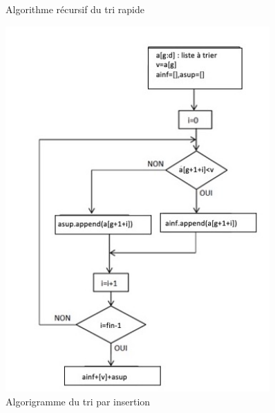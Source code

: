 \begin{figure}[!htb]
\begin{minipage}{0.5\textwidth}
\begin{algorithme}

\begin{center}
		
\end{center}


\end{algorithme}

\begin{algorithme}{Algorithme récursif du tri rapide}
\begin{center}
		
\end{center}
\end{algorithme}


\end{minipage}
\begin{minipage}{0.5\textwidth}
\begin{center}
\includegraphics[width=0.9\textwidth]{images/algorigramme_rapide.jpg}
\caption{Algorigramme du tri par insertion}
\end{center}
\end{minipage}
\end{figure}
%
%
%

